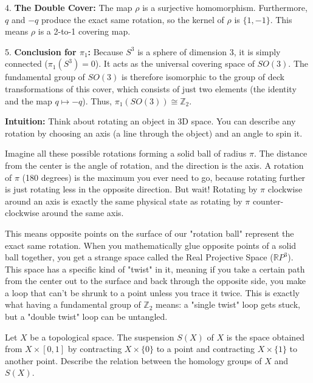 \begin{solution}
4. \textbf{The Double Cover:}
The map $\rho$ is a surjective homomorphism. Furthermore, $q$ and $-q$ produce the exact same rotation, so the kernel of $\rho$ is $\{1, -1\}$. This means $\rho$ is a 2-to-1 covering map.
\par\vspace{\baselineskip}

5. \textbf{Conclusion for $\pi_1$:}
Because $S^3$ is a sphere of dimension 3, it is simply connected ($\pi_1(S^3) = 0$). It acts as the universal covering space of $SO(3)$. The fundamental group of $SO(3)$ is therefore isomorphic to the group of deck transformations of this cover, which consists of just two elements (the identity and the map $q \mapsto -q$). Thus, $\pi_1(SO(3)) \cong \mathbb{Z}_2$.
\par\vspace{\baselineskip}

\textbf{Intuition:}
Think about rotating an object in 3D space. You can describe any rotation by choosing an axis (a line through the object) and an angle to spin it.
\par\vspace{\baselineskip}

Imagine all these possible rotations forming a solid ball of radius $\pi$. The distance from the center is the angle of rotation, and the direction is the axis. A rotation of $\pi$ (180 degrees) is the maximum you ever need to go, because rotating further is just rotating less in the opposite direction. But wait! Rotating by $\pi$ clockwise around an axis is exactly the same physical state as rotating by $\pi$ counter-clockwise around the same axis. 
\par\vspace{\baselineskip}

This means opposite points on the surface of our "rotation ball" represent the exact same rotation. When you mathematically glue opposite points of a solid ball together, you get a strange space called the Real Projective Space ($\mathbb{R}P^3$). This space has a specific kind of "twist" in it, meaning if you take a certain path from the center out to the surface and back through the opposite side, you make a loop that can't be shrunk to a point unless you trace it twice. This is exactly what having a fundamental group of $\mathbb{Z}_2$ means: a "single twist" loop gets stuck, but a "double twist" loop can be untangled.
\end{solution}

\begin{exercise}
\label{geometry:2015:8}
Let $X$ be a topological space. The suspension $S(X)$ of $X$ is the space obtained from $X \times [0, 1]$ by contracting $X \times \{0\}$ to a point and contracting $X \times \{1\}$ to another point. Describe the relation between the homology groups of $X$ and $S(X)$.
\end{exercise}

